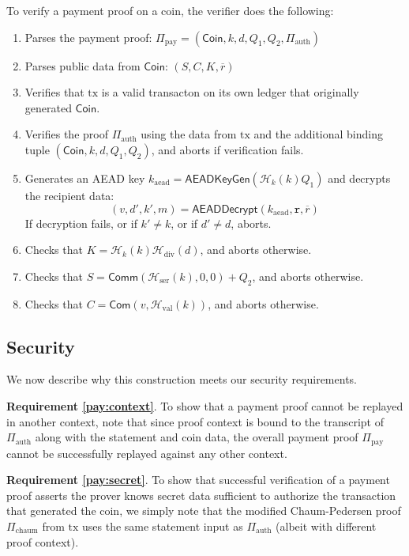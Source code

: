 \documentclass{llncs}
\newcommand{\hash}{\mathcal{H}}
\newcommand{\func}[1]{\mathsf{#1}}
\newcommand{\com}{\func{Com}}
\newcommand{\comm}{\func{Comm}}
\begin{document}
To verify a payment proof on a coin, the verifier does the following:
\begin{enumerate}
    \item Parses the payment proof: $\Pi_{\text{pay}} = (\func{Coin},k,d,Q_1,Q_2,\Pi_{\text{auth}})$
    \item Parses public data from $\func{Coin}$: $(S,C,K,\overline{r})$
    \item Verifies that $\text{tx}$ is a valid transacton on its own ledger that originally generated $\func{Coin}$.
    \item Verifies the proof $\Pi_{\text{auth}}$ using the data from $\text{tx}$ and the additional binding tuple $(\func{Coin},k,d,Q_1,Q_2)$, and aborts if verification fails.
    \item Generates an AEAD key $k_{\text{aead}} = \func{AEADKeyGen}(\hash_k(k) Q_1)$ and decrypts the recipient data: $$(v, d', k', m) = \func{AEADDecrypt}(k_{\text{aead}},\texttt{r},\overline{r})$$
    If decryption fails, or if $k' \neq k$, or if $d' \neq d$, aborts.
    \item Checks that $K = \hash_k(k)\hash_{\text{div}}(d)$, and aborts otherwise.
    \item Checks that $S = \comm(\hash_{\text{ser}}(k),0,0) + Q_2$, and aborts otherwise.
    \item Checks that $C = \com(v, \hash_{\text{val}}(k))$, and aborts otherwise.
\end{enumerate}


\subsection{Security}

We now describe why this construction meets our security requirements.

\textbf{Requirement \ref{pay:context}}. To show that a payment proof cannot be replayed in another context, note that since proof context is bound to the transcript of $\Pi_{\text{auth}}$ along with the statement and coin data, the overall payment proof $\Pi_{\text{pay}}$ cannot be successfully replayed against any other context.

\textbf{Requirement \ref{pay:secret}}. To show that successful verification of a payment proof asserts the prover knows secret data sufficient to authorize the transaction that generated the coin, we simply note that the modified Chaum-Pedersen proof $\Pi_{\text{chaum}}$ from $\text{tx}$ uses the same statement input as $\Pi_{\text{auth}}$ (albeit with different proof context).
\end{document}
